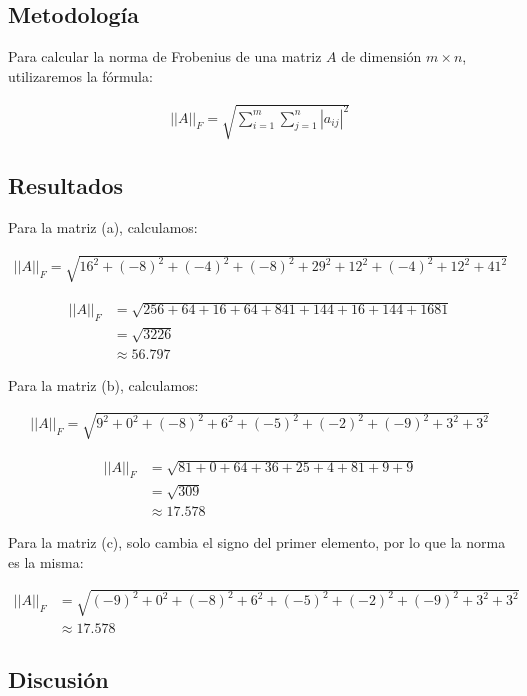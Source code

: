 \documentclass{article}
\begin{document}
\subsection{Metodología}

Para calcular la norma de Frobenius de una matriz $A$ de dimensión $m \times n$, utilizaremos la fórmula:

\begin{align}
    ||A||_F = \sqrt{\sum_{i=1}^{m} \sum_{j=1}^{n} |a_{ij}|^2}
\end{align}
\subsection{Resultados}
\setcounter{equation}{0}

Para la matriz (a), calculamos:

\begin{align}
    ||A||_F = \sqrt{16^2 + (-8)^2 + (-4)^2 + (-8)^2 + 29^2 + 12^2 + (-4)^2 + 12^2 + 41^2}
\end{align}

\begin{align}
    ||A||_F &= \sqrt{256 + 64 + 16 + 64 + 841 + 144 + 16 + 144 + 1681} \\
    &= \sqrt{3226} \\
    &\approx 56.797
\end{align}

Para la matriz (b), calculamos:

\begin{align}
    ||A||_F = \sqrt{9^2 + 0^2 + (-8)^2 + 6^2 + (-5)^2 + (-2)^2 + (-9)^2 + 3^2 + 3^2}
\end{align}

\begin{align}
    ||A||_F &= \sqrt{81 + 0 + 64 + 36 + 25 + 4 + 81 + 9 + 9} \\
    &= \sqrt{309} \\
    &\approx 17.578
\end{align}

Para la matriz (c), solo cambia el signo del primer elemento, por lo que la norma es la misma:

\begin{align}
    ||A||_F &= \sqrt{(-9)^2 + 0^2 + (-8)^2 + 6^2 + (-5)^2 + (-2)^2 + (-9)^2 + 3^2 + 3^2} \\
    &\approx 17.578
\end{align}

\subsection{Discusión}
\end{document}
